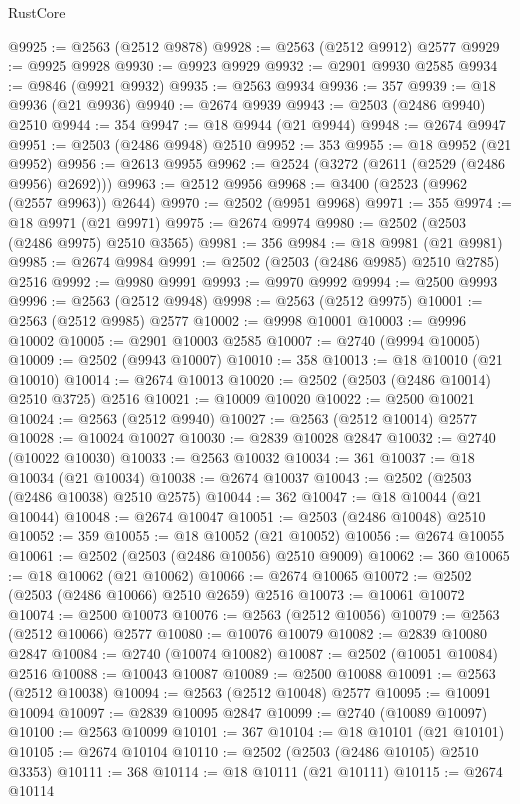 \begin{lexlean}{RustCore}
\begin{coremodule}
@9925 := @2563 (@2512 @9878)
@9928 := @2563 (@2512 @9912) @2577
@9929 := @9925 @9928
@9930 := @9923 @9929
@9932 := @2901 @9930 @2585
@9934 := @9846 (@9921 @9932)
@9935 := @2563 @9934
@9936 := 357
@9939 := @18 @9936 (@21 @9936)
@9940 := @2674 @9939
@9943 := @2503 (@2486 @9940) @2510
@9944 := 354
@9947 := @18 @9944 (@21 @9944)
@9948 := @2674 @9947
@9951 := @2503 (@2486 @9948) @2510
@9952 := 353
@9955 := @18 @9952 (@21 @9952)
@9956 := @2613 @9955
@9962 := @2524 (@3272 (@2611 (@2529 (@2486 @9956) @2692)))
@9963 := @2512 @9956
@9968 := @3400 (@2523 (@9962 (@2557 @9963)) @2644)
@9970 := @2502 (@9951 @9968)
@9971 := 355
@9974 := @18 @9971 (@21 @9971)
@9975 := @2674 @9974
@9980 := @2502 (@2503 (@2486 @9975) @2510 @3565)
@9981 := 356
@9984 := @18 @9981 (@21 @9981)
@9985 := @2674 @9984
@9991 := @2502 (@2503 (@2486 @9985) @2510 @2785) @2516
@9992 := @9980 @9991
@9993 := @9970 @9992
@9994 := @2500 @9993
@9996 := @2563 (@2512 @9948)
@9998 := @2563 (@2512 @9975)
@10001 := @2563 (@2512 @9985) @2577
@10002 := @9998 @10001
@10003 := @9996 @10002
@10005 := @2901 @10003 @2585
@10007 := @2740 (@9994 @10005)
@10009 := @2502 (@9943 @10007)
@10010 := 358
@10013 := @18 @10010 (@21 @10010)
@10014 := @2674 @10013
@10020 := @2502 (@2503 (@2486 @10014) @2510 @3725) @2516
@10021 := @10009 @10020
@10022 := @2500 @10021
@10024 := @2563 (@2512 @9940)
@10027 := @2563 (@2512 @10014) @2577
@10028 := @10024 @10027
@10030 := @2839 @10028 @2847
@10032 := @2740 (@10022 @10030)
@10033 := @2563 @10032
@10034 := 361
@10037 := @18 @10034 (@21 @10034)
@10038 := @2674 @10037
@10043 := @2502 (@2503 (@2486 @10038) @2510 @2575)
@10044 := 362
@10047 := @18 @10044 (@21 @10044)
@10048 := @2674 @10047
@10051 := @2503 (@2486 @10048) @2510
@10052 := 359
@10055 := @18 @10052 (@21 @10052)
@10056 := @2674 @10055
@10061 := @2502 (@2503 (@2486 @10056) @2510 @9009)
@10062 := 360
@10065 := @18 @10062 (@21 @10062)
@10066 := @2674 @10065
@10072 := @2502 (@2503 (@2486 @10066) @2510 @2659) @2516
@10073 := @10061 @10072
@10074 := @2500 @10073
@10076 := @2563 (@2512 @10056)
@10079 := @2563 (@2512 @10066) @2577
@10080 := @10076 @10079
@10082 := @2839 @10080 @2847
@10084 := @2740 (@10074 @10082)
@10087 := @2502 (@10051 @10084) @2516
@10088 := @10043 @10087
@10089 := @2500 @10088
@10091 := @2563 (@2512 @10038)
@10094 := @2563 (@2512 @10048) @2577
@10095 := @10091 @10094
@10097 := @2839 @10095 @2847
@10099 := @2740 (@10089 @10097)
@10100 := @2563 @10099
@10101 := 367
@10104 := @18 @10101 (@21 @10101)
@10105 := @2674 @10104
@10110 := @2502 (@2503 (@2486 @10105) @2510 @3353)
@10111 := 368
@10114 := @18 @10111 (@21 @10111)
@10115 := @2674 @10114

\end{coremodule}
\end{lexlean}
